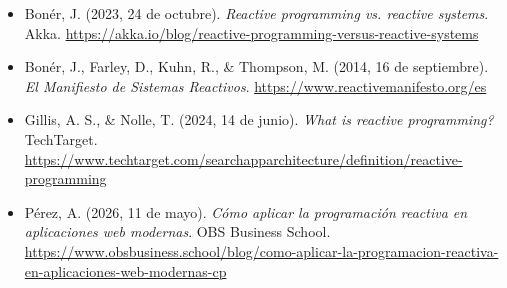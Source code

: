 \documentclass[12pt]{article}
\begin{document}
\begin{itemize}[
	leftmargin=1.27cm,
	label={},
	itemindent=-1.27cm,
	itemsep=6pt
	]
	
	\item Bonér, J. (2023, 24 de octubre).
	\textit{Reactive programming vs. reactive systems}.
	Akka.
	\url{https://akka.io/blog/reactive-programming-versus-reactive-systems}
	
	\item Bonér, J., Farley, D., Kuhn, R., \& Thompson, M.
	(2014, 16 de septiembre).
	\textit{El Manifiesto de Sistemas Reactivos}.
	\url{https://www.reactivemanifesto.org/es}
	
	\item Gillis, A. S., \& Nolle, T. (2024, 14 de junio).
	\textit{What is reactive programming?}
	TechTarget.
	\url{https://www.techtarget.com/searchapparchitecture/definition/reactive-programming}
	
	\item Pérez, A. (2026, 11 de mayo).
	\textit{Cómo aplicar la programación reactiva en aplicaciones web modernas}.
	OBS Business School.
	\url{https://www.obsbusiness.school/blog/como-aplicar-la-programacion-reactiva-en-aplicaciones-web-modernas-cp}
	\end{itemize}
	
\end{document}
